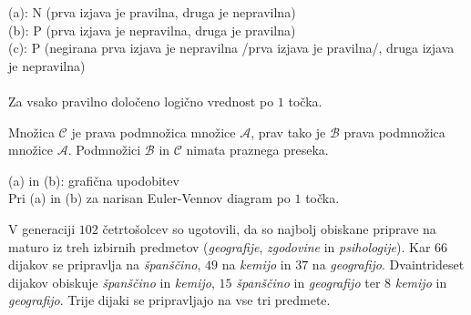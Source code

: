 \documentclass[addpoints]{exam}
\begin{document}
\begin{questions}
    \begin{solution}
        (a): N (prva izjava je pravilna, druga je nepravilna) \\
        (b): P (prva izjava je nepravilna, druga je pravilna) \\
        (c): P (negirana prva izjava je nepravilna /prva izjava je pravilna/, druga izjava je nepravilna) \\ \\
        Za vsako pravilno določeno logično vrednost po $1$ točka.
    \end{solution}



    \newpage



    \question
    Množica $\mathcal{C}$ je prava podmnožica množice $\mathcal{A}$, prav tako je $\mathcal{B}$ prava podmnožica množice $\mathcal{A}$. Podmnožici $\mathcal{B}$ in $\mathcal{C}$ nimata praznega preseka.

    \begin{solution}[8cm]
        (a) in (b): grafična upodobitev \\
        Pri (a) in (b) za narisan Euler-Vennov diagram po $1$ točka.
    \end{solution}


    \question
    V generaciji $102$ četrtošolcev so ugotovili, da so najbolj obiskane priprave na maturo iz treh izbirnih predmetov (\textit{geografije}, \textit{zgodovine} in \textit{psihologije}).
    Kar $66$ dijakov se pripravlja na \textit{španščino}, $49$ na \textit{kemijo} in $37$ na \textit{geografijo}. Dvaintrideset dijakov obiskuje \textit{španščino} in \textit{kemijo},
    $15$ \textit{španščino} in \textit{geografijo} ter $8$ \textit{kemijo} in \textit{geografijo}. Trije dijaki se pripravljajo na vse tri predmete.
    \begin{parts}

\end{parts}
\end{questions}
\end{document}

